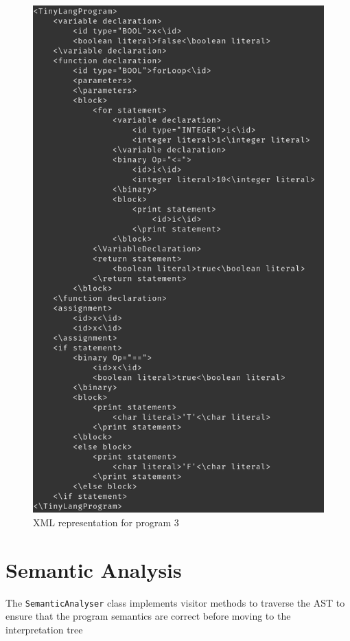 \begin{figure}[H]
	\centering
	\includegraphics[scale=0.5]{Task345/images/xmlOutput3.png}
	\caption{XML representation for program 3}
	\label{fig:xml tree 3}
\end{figure}

\chapter{Semantic Analysis}
The \verb!SemanticAnalyser! class implements visitor methods to traverse the AST to ensure that the program semantics are correct before moving to the interpretation tree
